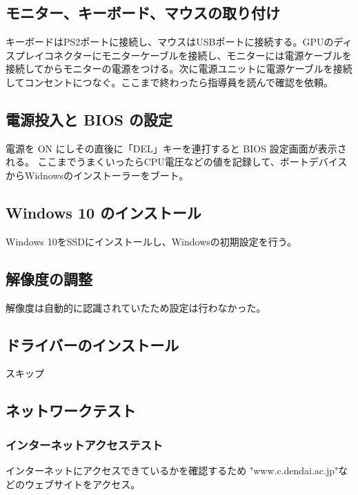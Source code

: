 \documentclass[10pt]{article}
\begin{document}
\subsection{モニター、キーボード、マウスの取り付け}
\hspace{1cm}キーボードはPS2ポートに接続し、マウスはUSBポートに接続する。GPUのディスプレイコネクターにモニターケーブルを接続し、モニターには電源ケーブルを接続してからモニターの電源をつける。次に電源ユニットに電源ケーブルを接続してコンセントにつなぐ。ここまで終わったら指導員を読んで確認を依頼。


\subsection{ 電源投入と BIOS の設定}
\hspace{1cm}			
 電源を ON にしその直後に「DEL」キーを連打すると BIOS 設定画面が表示される。 ここまでうまくいったらCPU電圧などの値を記録して、ボートデバイスからWidnowsのインストーラーをブート。

\subsection{Windows 10 のインストール}
\hspace{1cm}Windows 10をSSDにインストールし、Windowsの初期設定を行う。

\subsection{解像度の調整}
\hspace{1cm}解像度は自動的に認識されていたため設定は行わなかった。

\subsection{ドライバーのインストール}
\hspace{1cm} スキップ

\subsection{ネットワークテスト}
\hspace{1cm}
\subsubsection{インターネットアクセステスト}
	インターネットにアクセスできているかを確認するため "www.c.dendai.ac.jp"などのウェブサイトをアクセス。 
\end{document}
